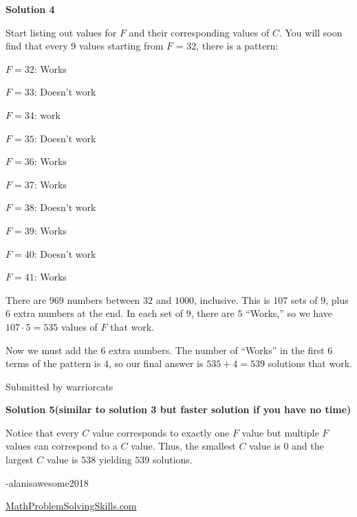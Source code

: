 \begin{enumerate}
 



\textbf{Solution 4}

Start listing out values for $F$ and their corresponding values of $C$. You will soon find that every 9 values starting from $F$ = 32, there is a pattern:

 $F=32$: Works

 $F=33$: Doesn't work

 $F=34$: work

 $F=35$: Doesn’t work

 $F=36$: Works

 $F=37$: Works

 $F=38$: Doesn’t work

 $F=39$: Works

 $F=40$: Doesn’t work

 $F=41$: Works

 There are $969$ numbers between $32$ and $1000$, inclusive. This is $107$ sets of $9$, plus $6$ extra numbers at the end. In each set of $9$, there are $5$ “Works,” so we have $107\cdot5 = 535$ values of $F$ that work.

 Now we must add the $6$ extra numbers. The number of “Works” in the first $6$ terms of the pattern is $4$, so our final answer is $535 + 4 = 539$ solutions that work.

 Submitted by warriorcats

 



\textbf{Solution 5(similar to solution 3 but faster solution if you have no time)}

Notice that every $C$ value corresponds to exactly one $F$ value but multiple $F$ values can correspond to a $C$ value. Thus, the smallest $C$ value is $0$ and the largest $C$ value is $538$ yielding $\boxed{539}$ solutions.

 -alanisawesome2018

 \href{https://mathproblemsolvingskills.wordpress.com/}{MathProblemSolvingSkills.com}

 


 



\end{enumerate}
